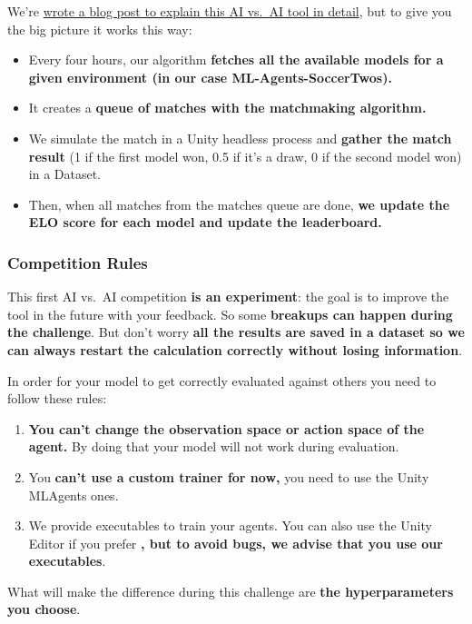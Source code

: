 \documentclass[11pt,a4paper]{article}
\begin{document}
We're \href{https://huggingface.co/blog/aivsai}{wrote a blog post to explain this AI vs.~AI tool in detail}, but to give you the big picture it works this way:

\begin{itemize}
\tightlist
\item
  Every four hours, our algorithm \textbf{fetches all the available models for a given environment (in our case ML-Agents-SoccerTwos).}
\item
  It creates a \textbf{queue of matches with the matchmaking algorithm.}
\item
  We simulate the match in a Unity headless process and \textbf{gather the match result} (1 if the first model won, 0.5 if it's a draw, 0 if the second model won) in a Dataset.
\item
  Then, when all matches from the matches queue are done, \textbf{we update the ELO score for each model and update the leaderboard.}
\end{itemize}

\subsubsection{Competition Rules}\label{competition-rules}

This first AI vs.~AI competition \textbf{is an experiment}: the goal is to improve the tool in the future with your feedback. So some \textbf{breakups can happen during the challenge}. But don't worry \textbf{all the results are saved in a dataset so we can always restart the calculation correctly without losing information}.

In order for your model to get correctly evaluated against others you need to follow these rules:

\begin{enumerate}
\def\labelenumi{\arabic{enumi}.}
\tightlist
\item
  \textbf{You can't change the observation space or action space of the agent.} By doing that your model will not work during evaluation.
\item
  You \textbf{can't use a custom trainer for now,} you need to use the Unity MLAgents ones.
\item
  We provide executables to train your agents. You can also use the Unity Editor if you prefer \textbf{, but to avoid bugs, we advise that you use our executables}.
\end{enumerate}

What will make the difference during this challenge are \textbf{the hyperparameters you choose}.
\end{document}
